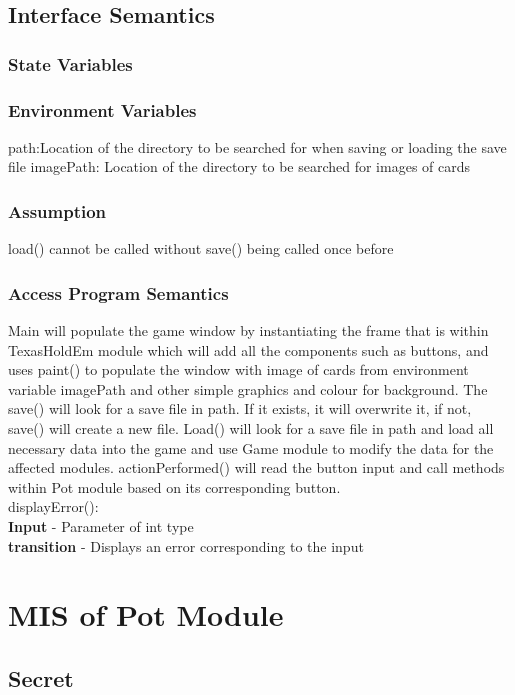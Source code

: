 \documentclass[11pt]{article}
\begin{document}
    \subsection{Interface Semantics}
    \subsubsection{State Variables}
    
    \subsubsection{Environment Variables}
	path:Location of the directory to be searched for when saving or loading the save file
	imagePath: Location of the directory to be searched for images of cards
    \subsubsection{Assumption}
    load() cannot be called without save() being called once before
    \subsubsection{Access Program Semantics}
    Main will populate the game window by instantiating the frame that is within TexasHoldEm module which will add all the components such as buttons, and uses paint() to populate the window with image of cards from environment variable imagePath and other simple graphics and colour for background. The save() will look for a save file in path. If it exists, it will overwrite it, if not, save() will create a new file. Load() will look for a save file in path and load all necessary data into the game and use Game module to modify the data for the affected modules. actionPerformed() will read the button input and call methods within Pot module based on its corresponding button. \\
    displayError():\\
    \textbf{Input} - Parameter of int type\\
    \textbf{transition} - Displays an error corresponding to the input  
    \newline
     \section{MIS of Pot Module}
     \subsection{Secret}
\end{document}
